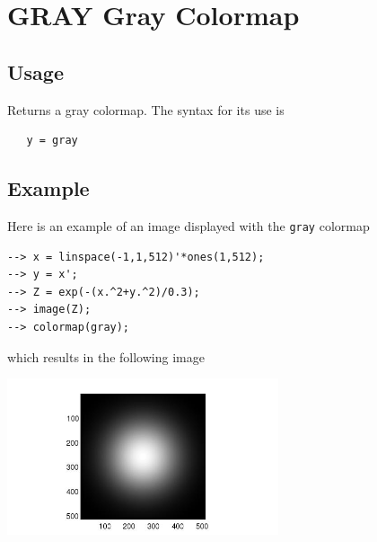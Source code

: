 \section{GRAY Gray Colormap}

\subsection{Usage}

Returns a gray colormap.  The syntax for its use is
\begin{verbatim}
   y = gray
\end{verbatim}
\subsection{Example}

Here is an example of an image displayed with the \verb|gray|
colormap
\begin{verbatim}
--> x = linspace(-1,1,512)'*ones(1,512);
--> y = x';
--> Z = exp(-(x.^2+y.^2)/0.3);
--> image(Z);
--> colormap(gray);
\end{verbatim}
which results in the following image


\centerline{\includegraphics[width=8cm]{gray1}}

